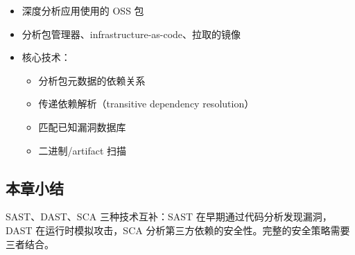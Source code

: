 \begin{itemize}
    \item 深度分析应用使用的 OSS 包
    \item 分析包管理器、infrastructure-as-code、拉取的镜像
    \item 核心技术：
    \begin{itemize}
        \item 分析包元数据的依赖关系
        \item 传递依赖解析（transitive dependency resolution）
        \item 匹配已知漏洞数据库
        \item 二进制/artifact 扫描
    \end{itemize}
\end{itemize}

\subsection{本章小结}

SAST、DAST、SCA 三种技术互补：SAST 在早期通过代码分析发现漏洞，DAST 在运行时模拟攻击，SCA 分析第三方依赖的安全性。完整的安全策略需要三者结合。

